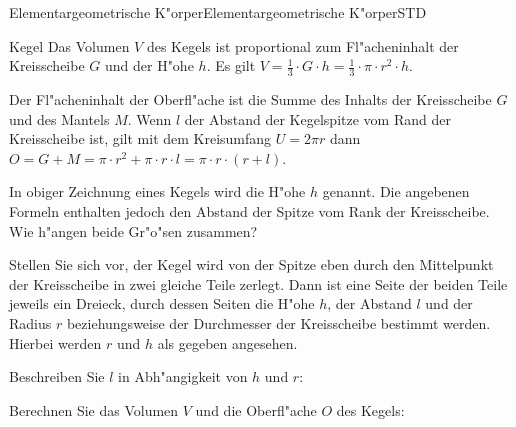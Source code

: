 \begin{MXContent}{Elementargeometrische K"orper}{Elementargeometrische K"orper}{STD}
\begin{MXInfo}{Kegel}
Das Volumen $V$ des Kegels ist proportional zum Fl"acheninhalt der 
Kreisscheibe $G$ und der H"ohe $h$. 
Es gilt $V = \frac{1}{3} \cdot G \cdot h %
 = \frac{1}{3} \cdot \pi \cdot r^2 \cdot h$.

Der Fl"acheninhalt der Oberfl"ache ist die Summe des Inhalts der 
Kreisscheibe $G$ und des Mantels $M$. Wenn $l$ der Abstand der 
Kegelspitze vom Rand der Kreisscheibe ist, 
gilt mit dem Kreisumfang $U =  2 \pi r$ dann
$O = G + M = \pi \cdot r^2 + \pi \cdot r \cdot l %
 = \pi \cdot r \cdot (r + l)$.
\end{MXInfo}

In obiger Zeichnung eines Kegels wird die H"ohe $h$ genannt. Die angebenen 
Formeln enthalten jedoch den Abstand der Spitze vom Rank der Kreisscheibe.
Wie h"angen beide Gr"o"sen zusammen?

\begin{MExercise}
Stellen Sie sich vor, der Kegel wird von der Spitze eben 
durch den Mittelpunkt der Kreisscheibe in zwei gleiche Teile zerlegt.
Dann ist eine Seite der beiden Teile jeweils ein Dreieck, durch dessen Seiten 
die H"ohe $h$, der Abstand $l$ und der Radius $r$ beziehungsweise der 
Durchmesser der Kreisscheibe bestimmt werden.
Hierbei werden $r$ und $h$ als gegeben angesehen.

\begin{MExerciseItems}
\item
Beschreiben Sie $l$ in Abh"angigkeit von $h$ und $r$:
\par
{}

\item
Berechnen Sie das Volumen $V$ und die Oberfl"ache $O$ des Kegels:
\begin{MExerciseItems}
\item %
\item %
\end{MExerciseItems}
\end{MExerciseItems}
\end{MExercise}

\end{MXContent}


